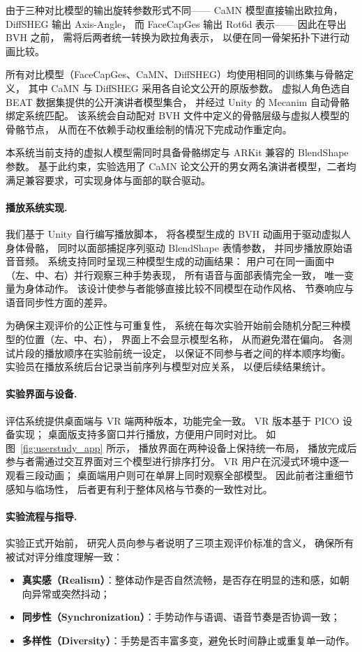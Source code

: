 \begin{table}[h]
由于三种对比模型的输出旋转参数形式不同——
CaMN 模型直接输出欧拉角，
DiffSHEG 输出 Axis-Angle，
而 FaceCapGes 输出 Rot6d 表示——
因此在导出 BVH 之前，
需将后两者统一转换为欧拉角表示，
以便在同一骨架拓扑下进行动画比较。

所有对比模型（FaceCapGes、CaMN、DiffSHEG）均使用相同的训练集与骨骼定义，
其中 CaMN 与 DiffSHEG 采用各自论文公开的原版参数。
虚拟人角色选自 BEAT 数据集提供的公开演讲者模型集合，
并经过 Unity 的 Mecanim 自动骨骼绑定系统匹配。
该系统会自动配对 BVH 文件中定义的骨骼层级与虚拟人模型的骨骼节点，
从而在不依赖手动权重绘制的情况下完成动作重定向。

本系统当前支持的虚拟人模型需同时具备骨骼绑定与 ARKit 兼容的 BlendShape 参数。
基于此约束，实验选用了 CaMN 论文公开的男女两名演讲者模型，二者均满足兼容要求，可实现身体与面部的联合驱动。

\paragraph{播放系统实现.}
我们基于 Unity 自行编写播放脚本，
将各模型生成的 BVH 动画用于驱动虚拟人身体骨骼，
同时以面部捕捉序列驱动 BlendShape 表情参数，
并同步播放原始语音音频。
系统支持同时呈现三种模型生成的动画结果：
用户可在同一画面中（左、中、右）并行观察三种手势表现，
所有语音与面部表情完全一致，
唯一变量为身体动作。
该设计使参与者能够直接比较不同模型在动作风格、
节奏响应与语音同步性方面的差异。

为确保主观评价的公正性与可重复性，
系统在每次实验开始前会随机分配三种模型的位置（左、中、右），
界面上不会显示模型名称，
从而避免潜在偏向。
各测试片段的播放顺序在实验前统一设定，
以保证不同参与者之间的样本顺序均衡。
实验员在播放系统后台记录当前序列与模型对应关系，
以便后续结果统计。

\paragraph{实验界面与设备.}
评估系统提供桌面端与 VR 端两种版本，功能完全一致。
VR 版本基于 PICO 设备实现；
桌面版支持多窗口并行播放，方便用户同时对比。
如图~\ref{fig:userstudy_app} 所示，
播放界面在两种设备上保持统一布局，
播放完成后参与者需通过交互界面对三个模型进行排序打分。
VR 用户在沉浸式环境中逐一观看三段动画；
桌面端用户则可在单屏上同时观察全部模型。
因此前者注重细节感知与临场性，
后者更有利于整体风格与节奏的一致性对比。

\paragraph{实验流程与指导.}
实验正式开始前，
研究人员向参与者说明了三项主观评价标准的含义，
确保所有被试对评分维度理解一致：
\begin{itemize}
    \item \textbf{真实感（Realism）}：整体动作是否自然流畅，是否存在明显的违和感，如朝向异常或突然抖动；
    \item \textbf{同步性（Synchronization）}：手势动作与语调、语音节奏是否协调一致；
    \item \textbf{多样性（Diversity）}：手势是否丰富多变，避免长时间静止或重复单一动作。
\end{itemize}


\end{table}
